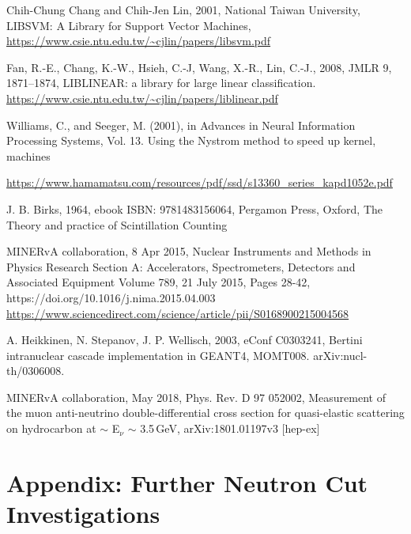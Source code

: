 \documentclass[12pt,a4paper]{article}
\begin{document}
\begin{thebibliography}{9}
Chih-Chung Chang and Chih-Jen Lin, 2001, National Taiwan University, LIBSVM: A Library for Support Vector Machines,  \url{https://www.csie.ntu.edu.tw/~cjlin/papers/libsvm.pdf} 

 Fan, R.-E., Chang, K.-W., Hsieh, C.-J, Wang, X.-R., Lin, C.-J., 2008, JMLR 9, 1871–1874, LIBLINEAR: a library for large linear classification.  \url{https://www.csie.ntu.edu.tw/~cjlin/papers/liblinear.pdf}

Williams, C., and Seeger, M. (2001), in Advances in Neural Information Processing Systems, Vol. 13. Using the Nystrom method to speed up kernel, machines

\url{https://www.hamamatsu.com/resources/pdf/ssd/s13360_series_kapd1052e.pdf}

J. B. Birks, 1964, ebook ISBN: 9781483156064, Pergamon Press, Oxford, The Theory and practice of Scintillation Counting

MINERvA collaboration, 8 Apr 2015, Nuclear Instruments and Methods in Physics Research Section A: Accelerators, Spectrometers, Detectors and Associated Equipment Volume 789, 21 July 2015, Pages 28-42, https://doi.org/10.1016/j.nima.2015.04.003 \url{https://www.sciencedirect.com/science/article/pii/S0168900215004568}

A. Heikkinen, N. Stepanov, J. P. Wellisch, 2003, eConf C0303241, Bertini intranuclear cascade implementation in GEANT4,  MOMT008. arXiv:nucl-th/0306008.

MINERvA collaboration, May 2018, Phys. Rev. D 97 052002, Measurement of the muon anti-neutrino double-differential cross section for quasi-elastic scattering on hydrocarbon at $\sim$ E$_\nu$ $\sim$ 3.5\,GeV, arXiv:1801.01197v3 [hep-ex]

\end{thebibliography}


\newpage
\appendix
\section{Appendix: Further Neutron Cut Investigations}
\end{document}
